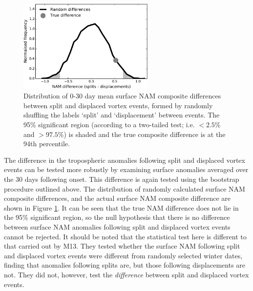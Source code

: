 \begin{figure}
 \centering
 \noindent\includegraphics[width=0.6\textwidth]{figures/chapter-moments/nam_difference_sig.pdf}
 \caption[Significance of surface NAM difference following split and displaced
 vortex events.]{Distribution of 0-30 day mean surface NAM composite differences
   between split and displaced vortex events, formed by randomly shuffling the
   labels `split' and `displacement' between events. The 95\% significant region
   (according to a two-tailed test; i.e. $<2.5$\% and $>97.5$\%) is shaded and
   the true composite difference is at the 94th percentile.}
 \label{fig:nam_comp_diff}
\end{figure}

The difference in the tropospheric anomalies following split and displaced
vortex events can be tested more robustly by examining surface anomalies
averaged over the 30 days following onset. This difference is again tested using
the bootstrap procedure outlined above. The distribution of randomly calculated
surface NAM composite differences, and the actual surface NAM composite
difference are shown in Figure \ref{fig:nam_comp_diff}. It can be seen that the
true NAM difference does not lie in the 95\% significant region, so the null
hypothesis that there is no difference between surface NAM anomalies following
split and displaced vortex events cannot be rejected. It should be noted that
the statistical test here is different to that carried out by M13. They tested
whether the surface NAM following split and displaced vortex events were
different from randomly selected winter dates, finding that anomalies following
splits are, but those following displacements are not. They did not, however,
test the \emph{difference} between split and displaced vortex events.

